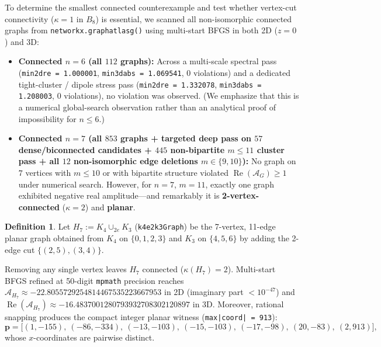 \documentclass[11pt]{amsart}
\renewcommand{\_}{\origunderscore\penalty0\relax}
\theoremstyle{plain}
\theoremstyle{definition}
\newtheorem{definition}[theorem]{Definition}
\theoremstyle{remark}
\newcommand{\AG}{\mathcal{A}_G}
\DeclareMathOperator{\RePart}{Re}
\begin{document}
To determine the smallest connected counterexample and test whether vertex-cut connectivity ($\kappa = 1$ in $B_8$) is essential, we scanned all non-isomorphic connected graphs from \texttt{networkx.graph\_atlas\_g()} using multi-start BFGS in both 2D ($z = 0$) and 3D:
\begin{itemize}
    \item \textbf{Connected $n = 6$ (all $112$ graphs):} Across a multi-scale spectral pass (\texttt{min\_2d\_re = 1.000001}, \texttt{min\_3d\_abs = 1.069541}, 0 violations) and a dedicated tight-cluster / dipole stress pass (\texttt{min\_2d\_re = 1.332078}, \texttt{min\_3d\_abs = 1.208003}, 0 violations), no violation was observed. (We emphasize that this is a numerical global-search observation rather than an analytical proof of impossibility for $n \le 6$.)
    \item \textbf{Connected $n = 7$ (all $853$ graphs + targeted deep pass on $57$ dense/biconnected candidates + $445$ non-bipartite $m \le 11$ cluster pass + all $12$ non-isomorphic edge deletions $m \in \{9, 10\}$):} No graph on $7$ vertices with $m \le 10$ or with bipartite structure violated $\RePart(\AG) \ge 1$ under numerical search. However, for $n = 7$, $m = 11$, exactly one graph exhibited negative real amplitude---and remarkably it is \textbf{2-vertex-connected} ($\kappa = 2$) and \textbf{planar}.
\end{itemize}

\begin{definition}
Let $H_7 := K_4 \cup_{2e} K_3$ (\texttt{k4e2k3Graph}) be the 7-vertex, 11-edge planar graph obtained from $K_4$ on $\{0,1,2,3\}$ and $K_3$ on $\{4,5,6\}$ by adding the 2-edge cut $\{(2,5), (3,4)\}$.
\end{definition}

Removing any single vertex leaves $H_7$ connected ($\kappa(H_7) = 2$). Multi-start BFGS refined at 50-digit \texttt{mpmath} precision reaches $\mathcal{A}_{H_7} \approx -22.8055729254814467535223667953$ in 2D (imaginary part $< 10^{-47}$) and $\RePart(\mathcal{A}_{H_7}) \approx -16.4837001280793932708302120897$ in 3D. Moreover, rational snapping produces the compact integer planar witness (\texttt{max|coord| = 913}):
\[
\mathbf{p} = \bigl[(1,-155),\ (-86,-334),\ (-13,-103),\ (-15,-103),\ (-17,-98),\ (20,-83),\ (2,913)\bigr],
\]
whose $x$-coordinates are pairwise distinct.
\end{document}
